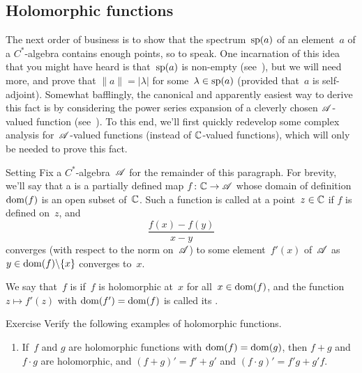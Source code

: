 \documentclass[a]{subfiles}
\begin{document}
\subsection{Holomorphic functions}
\begin{parsec}%
\begin{point}%
The next order of business
is to show that the spectrum~$\mathrm{sp}(a)$ of an element~$a$
of a $C^*$-algebra contains enough points, so to speak.
One incarnation of this idea that you might have heard
is that~$\mathrm{sp}(a)$ is non-empty
(see~), but
we will need more,
and prove that  $\|a\|=\left|\lambda\right|$
for some~$\lambda\in\mathrm{sp}(a)$
(provided that~$a$ is self-adjoint).
Somewhat bafflingly,
the canonical and apparently
easiest way to derive this fact is by considering the power series
expansion of a cleverly chosen $\mathscr{A}$-valued function
(see~).
To this end,
we'll first quickly redevelop some complex analysis
for~$\mathscr{A}$-valued functions
(instead of $\mathbb{C}$-valued functions),
which will only be needed to prove this fact.
\end{point}
\begin{point}{Setting}%
Fix a $C^*$-algebra~$\mathscr{A}$ for the remainder of this paragraph.
For brevity,
we'll say that a %
is a partially defined map $f\colon \mathbb{C}\to \mathscr{A}$
whose domain of definition $\operatorname{dom}(f)$%
is an open subset of~$\mathbb{C}$.
Such a function is called  at a point~$z\in \mathbb{C}$%
%
if $f$ is defined on~$z$,
and 
\begin{equation*}
\frac{f(x)-f(y)}{x-y}
\end{equation*}
converges (with respect to the norm on~$\mathscr{A}$)
to some element~$f'(x)$ of~$\mathscr{A}$
as $y\in \operatorname{dom}(f)\backslash\{x\}$
converges to~$x$.

We say that~$f$ is 
if~$f$ is holomorphic at~$x$ for all~$x\in \operatorname{dom}(f)$,
and the function $z\mapsto f'(z)$
with $\operatorname{dom}(f')=\operatorname{dom}(f)$
is called its .%
%
\end{point}
\begin{point}{Exercise}%
Verify the following examples of holomorphic functions.
\begin{enumerate}
\item
If~$f$ and $g$ are holomorphic functions with $\operatorname{dom}(f)=\operatorname{dom}(g)$,
then $f+g$ and $f\cdot g$ are holomorphic,
and $(f+g)'=f'+g'$ and $(f\cdot g)' = f'g+g'f$.


\end{enumerate}
\end{point}
\end{parsec}
\end{document}
